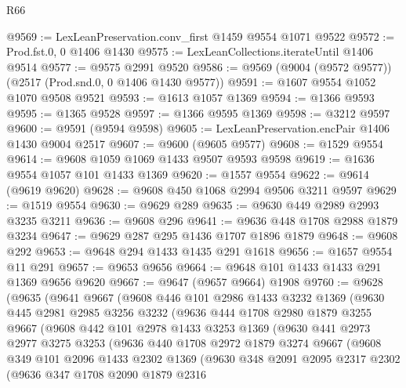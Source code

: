 \begin{lexlean}{R66}
\begin{coremodule}
@9569 := LexLeanPreservation.conv_first @1459 @9554 @1071 @9522
@9572 := Prod.fst.{0, 0} @1406 @1430
@9575 := LexLeanCollections.iterateUntil @1406 @9514
@9577 := @9575 @2991 @9520
@9586 := @9569 (@9004 (@9572 @9577)) (@2517 (Prod.snd.{0, 0} @1406 @1430 @9577))
@9591 := @1607 @9554 @1052 @1070 @9508 @9521
@9593 := @1613 @1057 @1369
@9594 := @1366 @9593
@9595 := @1365 @9528
@9597 := @1366 @9595 @1369
@9598 := @3212 @9597
@9600 := @9591 (@9594 @9598)
@9605 := LexLeanPreservation.encPair @1406 @1430 @9004 @2517
@9607 := @9600 (@9605 @9577)
@9608 := @1529 @9554
@9614 := @9608 @1059 @1069 @1433 @9507 @9593 @9598
@9619 := @1636 @9554 @1057 @101 @1433 @1369
@9620 := @1557 @9554
@9622 := @9614 (@9619 @9620)
@9628 := @9608 @450 @1068 @2994 @9506 @3211 @9597
@9629 := @1519 @9554
@9630 := @9629 @289
@9635 := @9630 @449 @2989 @2993 @3235 @3211
@9636 := @9608 @296
@9641 := @9636 @448 @1708 @2988 @1879 @3234
@9647 := @9629 @287 @295 @1436 @1707 @1896 @1879
@9648 := @9608 @292
@9653 := @9648 @294 @1433 @1435 @291 @1618
@9656 := @1657 @9554 @11 @291
@9657 := @9653 @9656
@9664 := @9648 @101 @1433 @1433 @291 @1369 @9656 @9620
@9667 := @9647 (@9657 @9664) @1908
@9760 := @9628
    (@9635
      (@9641
        @9667
        (@9608
          @446
          @101
          @2986
          @1433
          @3232
          @1369
          (@9630
            @445
            @2981
            @2985
            @3256
            @3232
            (@9636
              @444
              @1708
              @2980
              @1879
              @3255
              @9667
              (@9608
                @442
                @101
                @2978
                @1433
                @3253
                @1369
                (@9630
                  @441
                  @2973
                  @2977
                  @3275
                  @3253
                  (@9636
                    @440
                    @1708
                    @2972
                    @1879
                    @3274
                    @9667
                    (@9608
                      @349
                      @101
                      @2096
                      @1433
                      @2302
                      @1369
                      (@9630
                        @348
                        @2091
                        @2095
                        @2317
                        @2302
                        (@9636
                          @347
                          @1708
                          @2090
                          @1879
                          @2316

\end{coremodule}
\end{lexlean}
